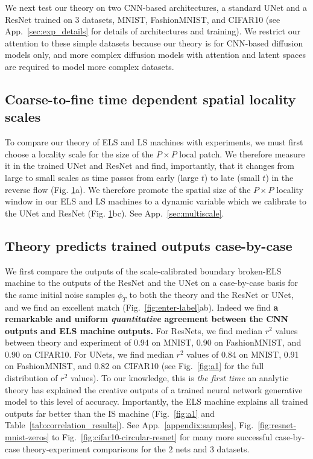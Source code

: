 \documentclass{article}
\theoremstyle{plain}
\theoremstyle{definition}
\theoremstyle{remark}
\begin{document}
\begin{figure}
    \label{fig:scales_jacobian} \vspace{-1em}
\end{figure}

We next test our theory on two CNN-based architectures, a standard UNet \cite{ronneberger2015u} and a ResNet \cite{he2016deep} trained on $3$ datasets, MNIST, FashionMNIST, and CIFAR10 (see App.~\ref{sec:exp_details} for details of architectures and training).  We restrict our attention to these simple datasets because our theory is for CNN-based diffusion models only, and more complex diffusion models with attention and latent spaces are required to model more complex datasets.

\subsection{Coarse-to-fine time dependent spatial locality scales}\label{sec:tdepfield}

To compare our theory of ELS and LS machines with experiments, we must first choose a locality scale for the size of the $P\times P$ local patch.  We therefore measure it in the trained UNet and ResNet and find, importantly, that it changes from large  to small scales as time passes from early (large $t$) to late (small $t$) in the reverse flow (Fig. \ref{fig:scales_jacobian}a).  We therefore promote the spatial size of the $P \times P$ locality window in our ELS and LS machines to a dynamic variable which we calibrate to the UNet and ResNet (Fig. \ref{fig:scales_jacobian}bc).  See App.~\ref{sec:multiscale}.  

\subsection{Theory predicts trained outputs case-by-case}\label{sec:tdepfield}


We first compare the outputs of the scale-calibrated boundary broken-ELS machine to the outputs of the ResNet and the UNet on a case-by-case basis for the same initial noise samples $\phi_T$ to both the theory and the ResNet or UNet, and we find an excellent match  (Fig.~\ref{fig:enter-label}ab). Indeed we find  \textbf{a remarkable and uniform \textit{quantitative} agreement between the CNN outputs and ELS machine outputs.} For ResNets, we find median $r^2$ values between theory and experiment of 0.94 on MNIST, 0.90 on FashionMNIST, and 0.90 on CIFAR10. For UNets, we find median $r^2$ values of 0.84 on MNIST, 0.91 on FashionMNIST, and 0.82 on CIFAR10 (see Fig.~\ref{fig:a1} for the full distribution of $r^2$ values). To our knowledge, this is {\it the first time} an analytic theory has explained the creative outputs of a trained neural network generative model to this level of accuracy. Importantly, the ELS machine explains all trained outputs far better than the IS machine (Fig.~\ref{fig:a1} and Table~\ref{tab:correlation_results}). See App.~\ref{appendix:samples}, Fig.~\ref{fig:resnet-mnist-zeros} to Fig.~\ref{fig:cifar10-circular-resnet} for many more successful case-by-case theory-experiment comparisons for the $2$ nets and $3$ datasets. 
\end{document}
